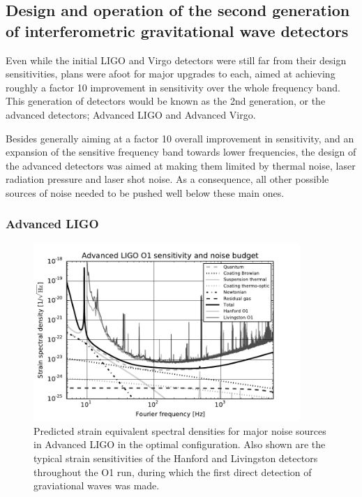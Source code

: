 \subsection{Design and operation of the second generation of interferometric gravitational wave detectors}\label{subsec:2ndgen}

Even while the initial LIGO and Virgo detectors were still far from their design sensitivities, plans were afoot for major 
upgrades to each, aimed at achieving roughly a factor 10 improvement in sensitivity over the whole frequency band. 
This generation of detectors would be known as the 2nd generation, or the advanced detectors; Advanced LIGO and 
Advanced Virgo. 

Besides generally aiming at a factor 10 overall improvement in sensitivity, and an expansion of the sensitive 
frequency band towards lower frequencies, the design of the advanced detectors was aimed at making them 
limited by thermal noise, laser radiation pressure and laser shot noise. As a consequence, all other possible 
sources of noise needed to be pushed well below these main ones.

\subsubsection{Advanced LIGO}

\begin{figure}[htb]
\begin{center}
\includegraphics[width=0.9\textwidth]{aLIGOnbudget_gray.pdf}
\caption{Predicted strain equivalent spectral densities for major noise sources in Advanced LIGO in the 
optimal configuration. Also shown are the typical strain sensitivities of the Hanford and Livingston detectors 
throughout the O1 run, during which the first direct detection of graviational waves was made.}
\end{center}
\label{aLIGOnbudget}\end{figure}

